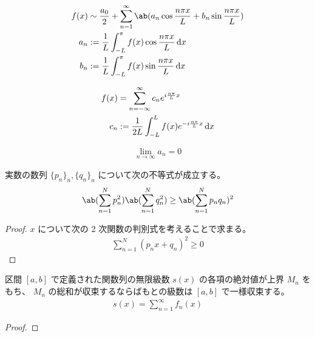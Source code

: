 \documentclass[uplatex,dvipdfmx,a4paper,11pt]{jlreq}
\begin{document}
\begin{definition}[一般の周期をもつ関数のフーリエ級数]
  \begin{align}
    f(x) & \sim \frac{a_0}{2} + \sum_{n=1}^{\infty}\ab(a_n\cos\frac{n\pi x}{L} + b_n\sin\frac{n\pi x}{L}) \\
    a_n  & := \frac{1}{L}\int_{-L}^\pi f(x)\cos\frac{n\pi x}{L}\dl{x}                                     \\
    b_n  & := \frac{1}{L}\int_{-L}^\pi f(x)\sin\frac{n\pi x}{L}\dl{x}
  \end{align}
\end{definition}
\begin{definition}[一般の周期をもつ関数の複素フーリエ級数]
  \begin{align}
    f(x) & = \sum_{n=-\infty}^{\infty}c_ne^{i\frac{n\pi}{L}x}         \\
    c_n  & := \frac{1}{2L}\int_{-L}^L f(x)e^{-i\frac{n\pi}{L}x}\dl{x}
  \end{align}
\end{definition}

\begin{theorem}
  \begin{align}
    \lim_{n\to\infty}a_n = 0
  \end{align}
\end{theorem}

\begin{lemma}[コーシーの不等式]
  実数の数列 $\lbrace p_n\rbrace_n, \lbrace q_n\rbrace_n$ について次の不等式が成立する。
  \begin{align}
    \ab(\sum_{n=1}^{N}p_n^2)\ab(\sum_{n=1}^{N}q_n^2) \geq \ab(\sum_{n=1}^{N}p_nq_n)^2
  \end{align}
\end{lemma}
\begin{proof}
  $x$ について次の 2 次関数の判別式を考えることで求まる。
  \begin{align}
    \sum_{n=1}^{N}(p_nx + q_n)^2 \geq 0
  \end{align}
\end{proof}

\begin{theorem}
  区間 $[a, b]$ で定義された関数列の無限級数 $s(x)$ の各項の絶対値が上界 $M_n$ をもち、 $M_n$ の総和が収束するならばもとの級数は $[a, b]$ で一様収束する。
  \begin{align}
    s(x) = \sum_{n=1}^{\infty}f_n(x)
  \end{align}
\end{theorem}
\begin{proof}

\end{proof}
\end{document}
